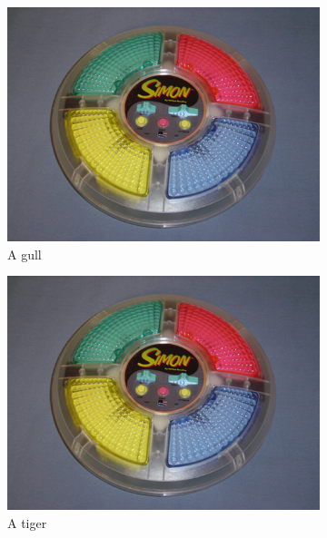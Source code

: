 \begin{figure}
    \begin{subfigure}{0.3\textwidth}
        \includegraphics[width=\textwidth]{./images/Simon_game.jpg}
        \caption{A gull}
        \label{fig:gull}
    \end{subfigure}%
    \begin{subfigure}{0.3\textwidth}
        \includegraphics[width=\textwidth]{./images/Simon_game.jpg}
        \caption{A tiger}
        \label{fig:tiger}
    \end{subfigure}
    \begin{subfigure}{0.3\textwidth}

\end{subfigure}
\end{figure}
